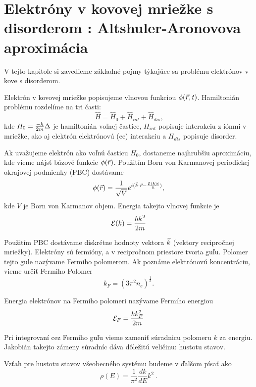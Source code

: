 \section{Elektróny v kovovej mriežke s disorderom : Altshuler-Aronovova aproximácia}
V tejto kapitole si zavedieme základné pojmy týkajúce sa problému elektrónov v kove s  
disorderom. 

Elektrón v kovovej mriežke popisujeme vlnovou funkciou $\phi(\vec{r},t) $.
 Hamiltonián problému rozdelíme na tri časti:
\begin{equation}
\label{eq:01Hamiltonian}
\hat H=\hat H_0+\hat H_{int}+\hat H_{dis} \text{,}
\end{equation}
kde $H_0=\frac{-\hbar}{2m}\Delta$ je hamiltonián voľnej častice,
$H_{int}$ popisuje interakciu z iónmi v mriežke, ako aj elektrón elektrónovú (ee) interakciu
a $H_{dis}$ popisuje disorder. 

Ak uvažujeme elektrón ako voľnú časticu $H_0$, dostaneme najhrubšiu aproximáciu, kde vieme nájsť bázové funkcie $\phi(\vec{r})$. 
Použitím Born von Karmanovej periodickej okrajovej podmienky (PBC) dostávame  
\begin{equation}
\phi(\vec{r})=\frac{1}{\sqrt{V}}e^{i(\vec k\cdot\vec r-\frac{\mathcal{E}(k)t}{\hbar})} \text{,}
\end{equation}
kde $V$ je Born von Karmanov objem. Energia takejto vlnovej funkcie je
\begin{equation}
\mathcal{E}(k)=\frac{\hbar k^2}{2m}
\end{equation}

Použitím PBC dostávame diskrétne hodnoty vektora $\vec{k}$ (vektory recipročnej mriežky). 
Elektróny sú fermióny, a v recipročnom priestore tvoria guľu. Polomer tejto gule nazývame Fermiho polomerom. Ak poznáme elektrónovú koncentráciu, vieme určiť Fermiho Polomer
\begin{equation}
 \label{eq:kf}
 k_F=(3\pi^2 n_e)^{\frac{1}{3}}\text{.}
\end{equation}
 
Energia elektrónov na Fermiho polomeri nazývame Fermiho energiou
\begin{equation}
\mathcal{E}_{F}=\frac{\hbar k_F^2}{2m}
\end{equation}

Pri integrovaní cez Fermiho guľu vieme zameniť súradnicu polomeru $k$ za energiu.
Jakobián takejto zámeny súradníc dáva dôležitú veličinu: hustotu stavov.

Vzťah pre hustotu stavov všeobecného systému budeme v ďalšom písať ako
\begin{equation}
\label{eq:01rho}
 \rho(E)=\frac{1}{\pi^2} \frac{dk}{dE} k^2  \ \text{.}
\end{equation}  

